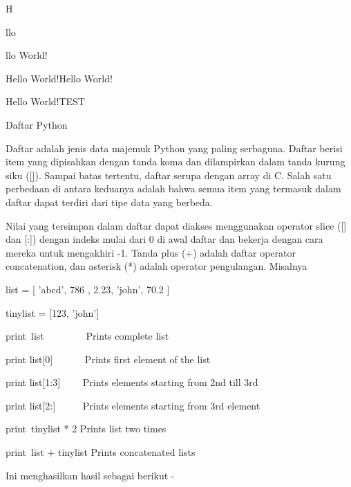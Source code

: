 \noindent 
H \par
\noindent 
llo \par
\noindent 
llo World! \par
\noindent 
Hello World!Hello World! \par
\noindent 
Hello World!TEST \par
\vspace{12pt}
\noindent 
Daftar Python \par
\vspace{12pt}
\noindent 
Daftar adalah jenis data majemuk Python yang paling serbaguna. $  $Daftar berisi item yang dipisahkan dengan tanda koma dan dilampirkan dalam tanda kurung siku ([]). $  $Sampai batas tertentu, daftar serupa dengan array di C. Salah satu perbedaan di antara keduanya adalah bahwa semua item yang termasuk dalam daftar dapat terdiri dari tipe data yang berbeda. \par
\vspace{12pt}
\noindent 
Nilai yang tersimpan dalam daftar dapat diakses menggunakan operator slice ([] dan [:]) dengan indeks mulai dari 0 di awal daftar dan bekerja dengan cara mereka untuk mengakhiri -1. $  $Tanda plus (+) adalah daftar operator concatenation, dan asterisk (*) adalah operator pengulangan. $  $Misalnya  \par
\vspace{12pt}
\vspace{12pt}
\noindent 
list = [ 'abcd', 786 , 2.23, 'john', 70.2 ] \par
\noindent 
tinylist = [123, 'john'] \par
\vspace{12pt}
\noindent 
print~list~~~~~~~~   Prints complete list \par
\noindent 
print list[0]~~~~~~  Prints first element of the list \par
\noindent 
print list[1:3]~~~~  Prints elements starting from 2nd till 3rd  \par
\noindent 
print list[2:]~~~~~  Prints elements starting from 3rd element \par
\noindent 
print~tinylist * 2   Prints list two times \par
\noindent 
print~list + tinylist   Prints concatenated lists \par
\vspace{12pt}
\noindent 
Ini menghasilkan hasil sebagai berikut - \par
\vspace{12pt}
 \par
